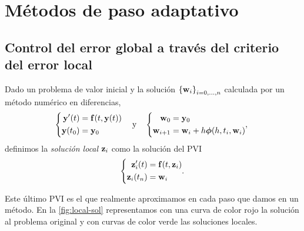 \section{Métodos de paso adaptativo}

\subsection{Control del error global a través del criterio del error local}

\begin{definition}
    Dado un problema de valor inicial y la solución
    $\qty{\vb{w}_i}_{i = 0,\ldots,n}$
    calculada por un método numérico en diferencias,
    \begin{equation*}
        \left\{
        \begin{aligned}
            \vy'(t) &= \vf(t, \vy(t)) \\
            \vy(t_0) &= \vy_0 \\
        \end{aligned}
        \right.
        \qq{y}
        \left\{
        \begin{aligned}
            \vw_0 &= \vy_0 \\
            \vw_{i+1} &= \vw_i + h \vphi(h, t_i, \vw_i)
        \end{aligned},
        \right.
    \end{equation*}
    definimos la \emph{solución local} $\vb{z}_i$
    como la solución del PVI
    \begin{equation*}
        \left\{
        \begin{aligned}
            \vb{z}_i'(t) &= \vb{f}(t, \vb{z}_i) \\
            \vb{z}_i(t_n) &= \vb{w}_i
        \end{aligned}.
        \right.
    \end{equation*}
\end{definition}

Este último PVI es el que realmente aproximamos
en cada paso que damos en un método.
En la \cref{fig:local-sol} representamos
con una curva de color rojo la solución al problema original
y con curvas de color verde las soluciones locales.

